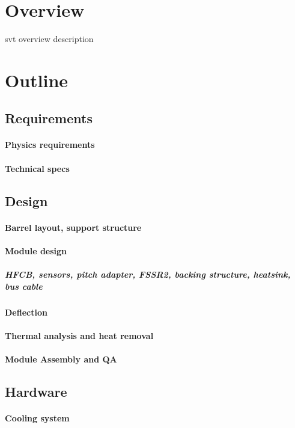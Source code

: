 \section{Overview}
svt overview description \cite{einstein}

\section{Outline}
\subsection{Requirements} 
\paragraph{Physics requirements} 
\paragraph{Technical specs} 
\subsection{Design}
\paragraph{Barrel layout, support structure}
\paragraph{Module design}
\subparagraph{HFCB, sensors, pitch adapter, FSSR2, backing structure, heatsink, bus cable}
\paragraph{Deflection}
\paragraph{Thermal analysis and heat removal}
\paragraph{Module Assembly and QA}
\subsection{Hardware}
\paragraph{Cooling system}
